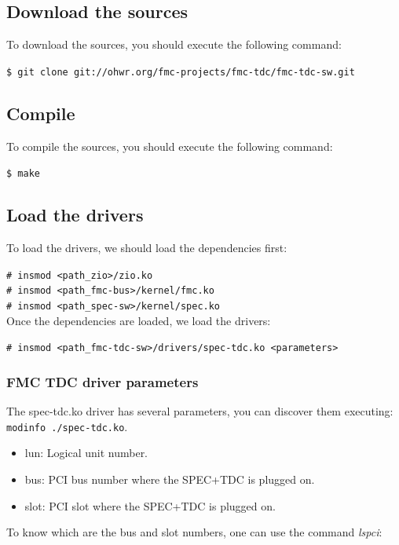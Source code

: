 \documentclass[a4paper,11pt]{article}
\begin{document}
\subsection{Download the sources}

To download the sources, you should execute the following command:

\indent\indent\texttt{\$ git clone git://ohwr.org/fmc-projects/fmc-tdc/fmc-tdc-sw.git}

\subsection{Compile}

To compile the sources, you should execute the following command:

\indent\indent\texttt{\$ make}

\subsection{Load the drivers}

To load the drivers, we should load the dependencies first:

\indent\indent\texttt{\# insmod <path\_zio>/zio.ko} \\
\indent\indent\texttt{\# insmod <path\_fmc-bus>/kernel/fmc.ko} \\
\indent\indent\texttt{\# insmod <path\_spec-sw>/kernel/spec.ko} \\
Once the dependencies are loaded, we load the drivers:

\indent\indent\texttt{\# insmod <path\_fmc-tdc-sw>/drivers/spec-tdc.ko <parameters>} 

\subsubsection{FMC TDC driver parameters}

The spec-tdc.ko driver has several parameters, you can discover them executing: \texttt{modinfo ./spec-tdc.ko}.

\begin{itemize}
\item lun: Logical unit number.
\item bus: PCI bus number where the SPEC+TDC is plugged on.
\item slot: PCI slot where the SPEC+TDC is plugged on.
\end{itemize}

To know which are the bus and slot numbers, one can use the command \textit{lspci}:
\end{document}
